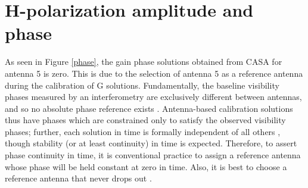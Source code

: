 \section{H-polarization amplitude and phase}
\label{Hp}
As seen in Figure \ref{phase}, the gain phase solutions obtained from CASA for antenna 5 is zero. This is due to the selection of antenna 5 as a reference antenna during the calibration of G solutions. Fundamentally, the baseline visibility phases measured by an interferometry are exclusively different between antennas, and so no absolute phase reference exists \citep{taylor1999synthesis}. Antenna-based calibration solutions thus have phases which are constrained only to satisfy the observed visibility phases; further, each solution in time is formally independent of all others \citep{taylor1999synthesis}, though stability (or at least continuity) in time is expected. Therefore, to assert phase continuity in time, it is conventional practice to assign a reference antenna whose phase will be held constant at zero in time. Also, it is best to choose a reference antenna that never drops out \citep{editioncasa}. 

